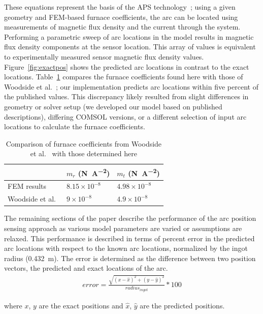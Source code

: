 \documentclass[onehalf,11pt]{beavtex}
\begin{document}
These equations represent the basis of the APS technology~\cite{Woodside:2013cf}; using a given geometry and FEM-based furnace coefficients, the arc can be located using measurements of magnetic flux density and the current through the system. 
Performing a parametric sweep of arc locations in the model results in magnetic flux density components at the sensor location.
This array of values is equivalent to experimentally measured sensor magnetic flux density values.
Figure~\ref{fig:exactpos} shows the predicted arc locations in contrast to the exact locations. 
Table~\ref{tab:new_coeffs} compares the furnace coefficients found here with those of Woodside et al.~\cite{Woodside:2013cf}; our implementation predicts arc locations within five percent of the published values. 
This discrepancy likely resulted from slight differences in geometry or solver setup (we developed our model based on published descriptions), differing COMSOL versions, or a different selection of input arc locations to calculate the furnace coefficients.

\begin{table}[htbp]
\centering
\caption{Comparison of furnace coefficients from Woodside et al.~\cite{Woodside:2013cf} with those determined here}
\begin{tabular}{@{}l l l@{}}
\toprule
	& \emph{$m_r$} (\si{\newton\per\ampere\squared}) & \emph{$m_t$} (\si{\newton\per\ampere\squared}) \\
\midrule
	FEM results & $8.15\times10^{-8}$ & $4.98\times10^{-8}$ \\
	Woodside et al.\ & $9\times10^{-8}$ & $4.9\times10^{-8}$ \\
\bottomrule
\end{tabular}
\label{tab:new_coeffs}
\end{table}

The remaining sections of the paper describe the performance of the arc position sensing approach as various model parameters are varied or assumptions are relaxed.
This performance is described in terms of percent error in the predicted arc locations with respect to the known arc locations, normalized by the ingot radius (\SI{0.432}{\meter}).
The error is determined as the difference between two position vectors, the predicted and exact locations of the arc. 
\begin{align}
	error = \frac{\sqrt{(x - \hat{x})^2 + (y - \hat{y})^2}}{radius_{ingot}}*100
\end{align}

where $x$, $y$ are the exact positions and $\hat{x}$, $\hat{y}$ are the predicted positions.
\end{document}
